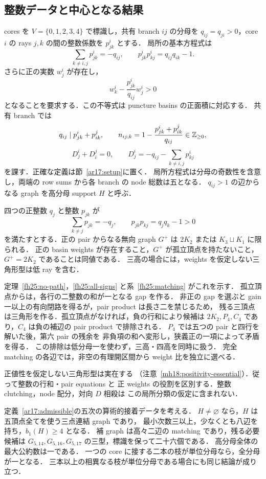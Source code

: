 \subsection{整数データと中心となる結果}

cores を $V=\{0,1,2,3,4\}$ で標識し，共有 branch $ij$ の分母を
$q_{ij}=q_{ji}>0$，core $i$ の rays $j,k$ の間の整数係数を $p^i_{jk}$ とする．
局所の基本方程式は
\[
 \sum_{k\ne i,j}p^i_{jk}=-q_{ij},\qquad
 p^i_{jk}p^i_{kj}=q_{ij}q_{ik}-1.
\]
さらに正の実数 $w^i_j$ が存在し，
\[
 w^i_k-\frac{p^i_{jk}}{q_{ij}}w^i_j>0
\]
となることを要求する．この不等式は puncture basins の正面積に対応する．
共有 branch では
\[
 q_{ij}\mid p^i_{jk}+p^j_{ik},\qquad
 n_{ij;k}=1-\frac{p^i_{jk}+p^j_{ik}}{q_{ij}}\in\mathbb Z_{\ge0},
\]
\[
 D^i_j+D^j_i=0,\qquad
 D^i_j=-q_{ij}-\sum_{k\ne i,j}p^i_{kj}
\]
を課す．正確な定義は節~\ref{ar17:setup}に置く．
局所方程式は分母の奇数性を含意し，両端の row sums から各 branch の node 総数は五となる．
$q_{ij}>1$ の辺からなる graph を高分母 support $H$ と呼ぶ．

\begin{theorem}[四ray整数データの符号と正値性]
\label{ar24:four-ray-positive}\label{ar18:main-matching}
四つの正整数 $q_j$ と整数 $p_{jk}$ が
\[
 \sum_{k\ne j}p_{jk}=-q_j,\qquad p_{jk}p_{kj}=q_jq_k-1>0
\]
を満たすとする．正の pair からなる無向 graph $G^+$ は
$2K_2$ または $K_3\sqcup K_1$ に限られる．
正の basin weights が存在すること，$G^+$ が孤立頂点を持たないこと，
$G^+=2K_2$ であることは同値である．
三高の場合には，weights を仮定しない三角形型は低 ray を含む．
\end{theorem}

定理~\ref{fh25:no-path}，\ref{fh25:all-signs} と系~\ref{fh25:matching} がこれを示す．
孤立頂点からは，各行の二整数の和が一となる gap を作る．
非正の gap を選ぶと gain 一以上の有向閉路を得るが，pair product は長さ二を禁じるため，
残る三頂点は三角形を作る．孤立頂点がなければ，負の行和により候補は
$2K_2,P_4,C_4$ であり，$C_4$ は負の補辺の pair product で排除される．
$P_4$ では五つの pair と四行を解いた後，第六 pair の残余を
非負項の和へ変形し，狭義正の一項によって矛盾を得る．
この排除は低分母一を使わず，三高・四高を同時に扱う．
完全 matching の各辺では，非空の有理開区間から weight 比を独立に選べる．

正値性を仮定しない三角形型は実在する
（注意~\ref{mh18:positivity-essential}）．従って整数の行和・pair equations と
正 weights の役割を区別する．整数 clutching，node 配分，対向 $D$ 相殺は
この局所分類の仮定に含まれない．

\begin{theorem}
\label{ar17:main-support}
定義~\ref{ar17:admissible}の五次の算術的接着データを考える．
$H\ne\varnothing$ なら，$H$ は五頂点全てを使う三点連結 graph であり，
最小次数三以上，少なくとも八辺を持ち，$b_1(H)\ge4$ となる．
補 graph は高々二辺の matching であり，残る必要候補は
$G_{5,14},G_{5,16},G_{5,17}$ の三型，標識を保って二十六個である．
高分母全体の最大公約数は一である．
一つの core に接する二本の枝が単位分母なら，全分母が一となる．
三本以上の相異なる枝が単位分母である場合にも同じ結論が成り立つ．
\end{theorem}

